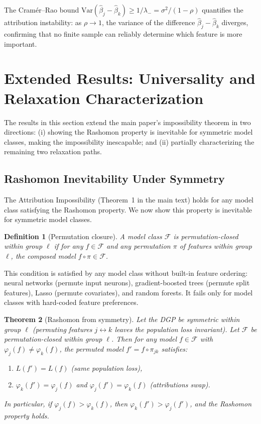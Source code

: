 \documentclass{article}
\newcommand{\Var}{\mathrm{Var}}
\newtheorem{theorem}{Theorem}
\newtheorem{definition}[theorem]{Definition}
\begin{document}
The Cram\'er--Rao bound
$\Var(\hat\beta_j - \hat\beta_k) \geq 1/\lambda_- = \sigma^2/(1-\rho)$
quantifies the attribution instability: as $\rho \to 1$, the variance of
the difference $\hat\beta_j - \hat\beta_k$ diverges, confirming that no
finite sample can reliably determine which feature is more important.


\section{Extended Results: Universality and Relaxation Characterization}

The results in this section extend the main paper's impossibility theorem
in two directions: (i) showing the Rashomon property is inevitable for
symmetric model classes, making the impossibility inescapable; and
(ii) partially characterizing the remaining two relaxation paths.

\subsection{Rashomon Inevitability Under Symmetry}

The Attribution Impossibility (Theorem~1 in the main text) holds for
any model class satisfying the Rashomon property. We now show this
property is inevitable for symmetric model classes.

\begin{definition}[Permutation closure]
\label{def:perm-closure}
A model class $\mathcal{F}$ is \emph{permutation-closed} within
group $\ell$ if for any $f \in \mathcal{F}$ and any permutation
$\pi$ of features within group $\ell$, the composed model
$f \circ \pi \in \mathcal{F}$.
\end{definition}

This condition is satisfied by any model class without built-in
feature ordering: neural networks (permute input neurons),
gradient-boosted trees (permute split features), Lasso (permute
covariates), and random forests. It fails only for model classes
with hard-coded feature preferences.

\begin{theorem}[Rashomon from symmetry]
\label{thm:rashomon-symmetry}
Let the DGP be symmetric within group $\ell$ (permuting features
$j \leftrightarrow k$ leaves the population loss invariant).
Let $\mathcal{F}$ be permutation-closed within group $\ell$.
Then for any model $f \in \mathcal{F}$ with
$\varphi_j(f) \neq \varphi_k(f)$, the permuted model
$f' = f \circ \pi_{jk}$ satisfies:
\begin{enumerate}
    \item $L(f') = L(f)$ (same population loss),
    \item $\varphi_k(f') = \varphi_j(f)$ and
          $\varphi_j(f') = \varphi_k(f)$ (attributions swap).
\end{enumerate}
In particular, if $\varphi_j(f) > \varphi_k(f)$, then
$\varphi_k(f') > \varphi_j(f')$, and the Rashomon property holds.
\end{theorem}
\end{document}
